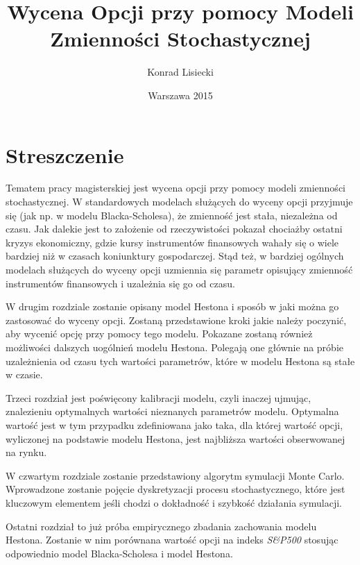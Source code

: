 \documentclass{pracamgr}
\author{Konrad Lisiecki}
\title{Wycena Opcji przy pomocy Modeli Zmienności Stochastycznej}
\date{Warszawa 2015}
\begin{document}
\maketitle

\cleardoublepage
{}
\chapter*{Streszczenie} 
 


Tematem pracy magisterskiej jest wycena opcji przy pomocy modeli zmienności stochastycznej. 
W standardowych modelach służących do wyceny opcji przyjmuje się (jak np. w modelu 
Blacka-Scholesa), że zmienność jest stała, niezależna od czasu. 
Jak dalekie jest to założenie od rzeczywistości pokazał chociażby ostatni kryzys 
ekonomiczny, gdzie kursy instrumentów finansowych wahały się o wiele bardziej niż w czasach
koniunktury gospodarczej. Stąd też, w bardziej ogólnych modelach służących do wyceny opcji uzmiennia 
się parametr opisujący zmienność instrumentów finansowych i uzależnia się go od czasu. 

W drugim rozdziale zostanie opisany model Hestona i sposób w jaki można go zastosować do wyceny 
opcji. Zostaną przedstawione kroki jakie należy poczynić, aby wycenić opcję przy pomocy tego modelu.
Pokazane zostaną również możliwości dalszych uogólnień modelu Hestona. 
Polegają one głównie na próbie uzależnienia od czasu tych wartości parametrów, które w 
modelu Hestona są stałe w czasie.

Trzeci rozdział jest poświęcony kalibracji modelu, czyli inaczej ujmując, znalezieniu 
optymalnych wartości nieznanych parametrów modelu. Optymalna wartość jest w tym przypadku zdefiniowana
jako taka, dla której wartość opcji, wyliczonej na podstawie modelu Hestona, jest najbliższa wartości 
obserwowanej na rynku.

W czwartym rozdziale zostanie przedstawiony algorytm symulacji Monte Carlo. 
Wprowadzone zostanie pojęcie dyskretyzacji procesu stochastycznego, które jest kluczowym elementem
jeśli chodzi o dokładność i szybkość działania symulacji. 


Ostatni rozdział to już próba empirycznego zbadania zachowania modelu Hestona. Zostanie w nim 
porównana wartość opcji na indeks \textit{S\&P500} stosując odpowiednio model Blacka-Scholesa i model 
Hestona.
\end{document}
